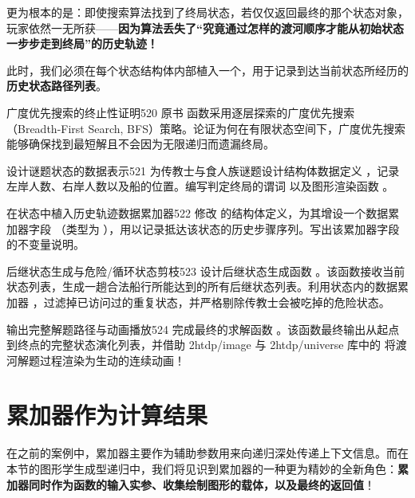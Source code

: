 更为根本的是：即使搜索算法找到了终局状态，若仅仅返回最终的那个状态对象，玩家依然一无所获——\textbf{因为算法丢失了“究竟通过怎样的渡河顺序才能从初始状态一步步走到终局”的历史轨迹！}

此时，我们必须在每个状态结构体内部植入一个，用于记录到达当前状态所经历的\textbf{历史状态路径列表}。

\begin{exercise}{广度优先搜索的终止性证明}{520}
原书  函数采用逐层探索的广度优先搜索（Breadth-First Search, BFS）策略。论证为何在有限状态空间下，广度优先搜索能够确保找到最短解且不会因为无限递归而遗漏终局。
\end{exercise}

\begin{exercise}{设计谜题状态的数据表示}{521}
为传教士与食人族谜题设计结构体数据定义 ，记录左岸人数、右岸人数以及船的位置。编写判定终局的谓词  以及图形渲染函数 。
\end{exercise}

\begin{exercise}{在状态中植入历史轨迹数据累加器}{522}
修改  的结构体定义，为其增设一个数据累加器字段 （类型为 ），用以记录抵达该状态的历史步骤序列。写出该累加器字段的不变量说明。
\end{exercise}

\begin{exercise}{后继状态生成与危险/循环状态剪枝}{523}
设计后继状态生成函数 。该函数接收当前状态列表，生成一趟合法船行所能达到的所有后继状态列表。利用状态内的数据累加器 ，过滤掉已访问过的重复状态，并严格剔除传教士会被吃掉的危险状态。
\end{exercise}

\begin{exercise}{输出完整解题路径与动画播放}{524}
完成最终的求解函数 。该函数最终输出从起点到终点的完整状态演化列表，并借助 2htdp/image 与 2htdp/universe 库中的  将渡河解题过程渲染为生动的连续动画！
\end{exercise}

\section{累加器作为计算结果}
\label{sec:ch33_3}

在之前的案例中，累加器主要作为辅助参数用来向递归深处传递上下文信息。而在本节的图形学生成型递归中，我们将见识到累加器的一种更为精妙的全新角色：\textbf{累加器同时作为函数的输入实参、收集绘制图形的载体，以及最终的返回值}！

